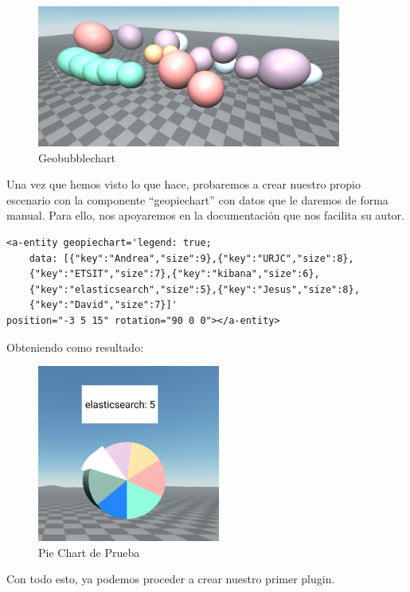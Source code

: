 \documentclass[a4paper, 12pt]{book}
\begin{document}
\begin{figure}[H]
  \centering
  \includegraphics[width=10cm, keepaspectratio]{img/development/babiaxr-bubble.png}
  \caption{Geobubblechart}
  \label{fig:babiaxrgeobubblechart}
\end{figure}


Una vez que hemos visto lo que hace, probaremos a crear nuestro propio escenario con la componente “geopiechart” con datos que le daremos de forma manual. Para ello, nos apoyaremos en la documentación que nos facilita su autor.

\begin{lstlisting}[frame=single]
<a-entity geopiechart='legend: true;
    data: [{"key":"Andrea","size":9},{"key":"URJC","size":8},
    {"key":"ETSIT","size":7},{"key":"kibana","size":6},
    {"key":"elasticsearch","size":5},{"key":"Jesus","size":8},
    {"key":"David","size":7}]'
position="-3 5 15" rotation="90 0 0"></a-entity>

\end{lstlisting}

Obteniendo como resultado:

\begin{figure}[H]
  \centering
  \includegraphics[width=6cm, keepaspectratio]{img/development/prueba-babiaxr.png}
  \caption{Pie Chart de Prueba}
  \label{fig:pruebababiaxr}
\end{figure}

Con todo esto, ya podemos proceder a crear nuestro primer plugin.
\end{document}
